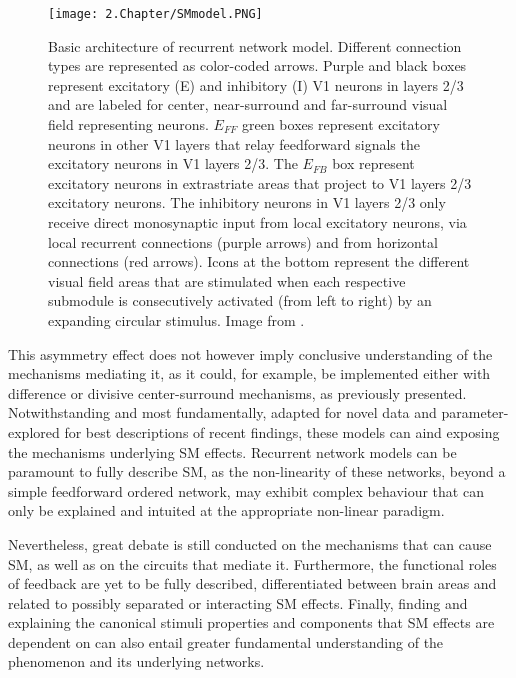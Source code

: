 \begin{figure}[H]
\center
\texttt{[image: 2.Chapter/SMmodel.PNG]}
\caption{Basic architecture of \cite{Schwabe2006} recurrent network model. Different connection types are represented as color-coded arrows. Purple and black boxes represent excitatory (E) and inhibitory (I) V1 neurons in layers 2/3 and are labeled for center, near-surround and far-surround visual field representing neurons. $E_{FF}$ green boxes represent excitatory neurons in other V1 layers that relay feedforward signals the excitatory neurons in V1 layers 2/3. The $E_{FB}$ box represent excitatory neurons in extrastriate areas that project to V1 layers 2/3 excitatory neurons. The inhibitory neurons in V1 layers 2/3 only receive direct monosynaptic input from local excitatory neurons, via local recurrent connections (purple arrows) and from horizontal connections (red arrows). 
Icons at the bottom represent the different visual field areas that are stimulated when each respective submodule is consecutively activated (from left to right) by an expanding circular stimulus.
\newline \newline \tiny{Image from \cite{Schwabe2006}.}}
\label{SMmodel}
\label{samondsnonun}
\end{figure}

This asymmetry effect does not however imply conclusive understanding of the mechanisms mediating it, as it could, for example, be implemented either with difference or divisive center-surround mechanisms, as previously presented. Notwithstanding and most fundamentally, adapted for novel data and parameter-explored for best descriptions of recent findings, these models can aind exposing the mechanisms underlying SM effects. Recurrent network models can be paramount to fully describe SM, as the non-linearity of these networks, beyond a simple feedforward ordered network, may exhibit complex behaviour that can only be explained and intuited at the appropriate non-linear paradigm.

Nevertheless, great debate is still conducted on the mechanisms that can cause SM, as well as on the circuits that mediate it. Furthermore, the functional roles of feedback are yet to be fully described, differentiated between brain areas and related to possibly separated or interacting SM effects. Finally, finding and explaining the canonical stimuli properties and components that SM effects are dependent on can also entail greater fundamental understanding of the phenomenon and its underlying networks. 

